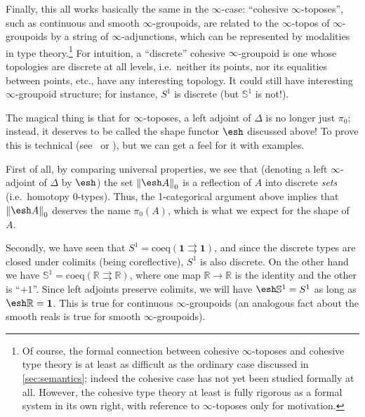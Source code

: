 \documentclass[10pt]{article}
\def\oo{\ensuremath{\infty}}
\def\R{\mathbb{R}}
\def\hocirc{S^1}
\def\topcirc{\mathbb{S}^1}
\def\unit{\mathbf{1}}
\numberwithin{equation}{section}
\newcommand{\trunc}[2]{\mathopen{}\left\Vert #2\right\Vert_{#1}\mathclose{}}
\newcommand{\shape}{\ensuremath{\mathord{\raisebox{0.5pt}{\text{\rm\esh}}}}}
\begin{document}
Finally, this all works basically the same in the \oo-case: ``cohesive \oo-toposes'', such as continuous and smooth \oo-groupoids, are related to the \oo-topos of \oo-groupoids by a string of \oo-adjunctions, which can be represented by modalities in type theory.\footnote{Of course, the formal connection between cohesive \oo-toposes and cohesive type theory is at least as difficult as the ordinary case discussed in \cref{sec:semantics}; indeed the cohesive case has not yet been studied formally at all.
However, the cohesive type theory at least is fully rigorous as a formal system in its own right, with reference to \oo-toposes only for motivation.}
For intuition, a ``discrete'' cohesive \oo-groupoid is one whose topologies are discrete at all levels, i.e.\ neither its points, nor its equalities between points, etc., have any interesting topology.
It could still have interesting \oo-groupoid structure; for instance, $\hocirc$ is discrete (but $\topcirc$ is not!).

The magical thing is that for $\oo$-toposes, a left adjoint of $\Delta$ is no longer just $\pi_0$; instead, it deserves to be called the shape functor $\shape$ discussed above!
To prove this is technical (see~\cite[Proposition 4.3.32]{schreiber:dcct} or \cite[\S3]{carchedi:hotyorb}), but we can get a feel for it with examples.

First of all, by comparing universal properties, we see that (denoting a left \oo-adjoint of $\Delta$ by $\shape$) the set $\trunc 0{\shape A}$ is a reflection of $A$ into discrete \emph{sets} (i.e.\ homotopy 0-types).
Thus, the 1-categorical argument above implies that $\trunc 0{\shape A}$ deserves the name $\pi_0(A)$, which is what we expect for the shape of $A$.

Secondly, %
we have seen that $\hocirc = \mathrm{coeq}(\unit\rightrightarrows\unit)$, and since the discrete types are closed under colimits (being coreflective), $\hocirc$ is also discrete.
On the other hand we have $\topcirc = \mathrm{coeq}(\R \rightrightarrows \R)$, where one map $\R\to\R$ is the identity and the other is ``$+1$''.
Since left adjoints preserve colimits, we will have $\shape\topcirc = \hocirc$ as long as $\shape \R=\unit$.
This is true for continuous $\oo$-groupoids (an analogous fact about the smooth reals is true for smooth $\oo$-groupoids).
\end{document}

